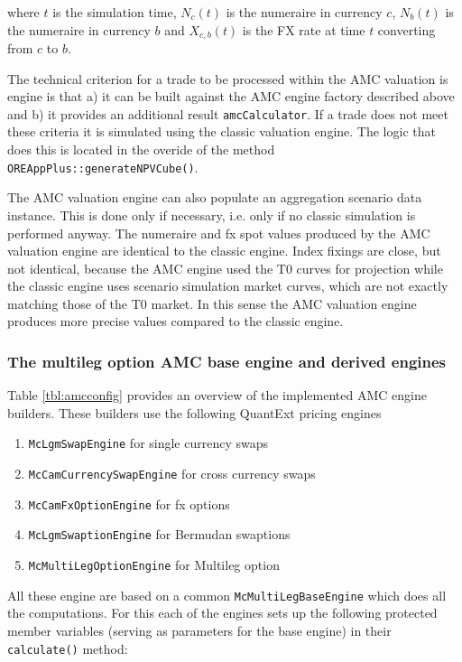 \documentclass[12pt, a4paper]{article}
\begin{document}
{\begin{appendix}
where $t$ is the simulation time, $N_c(t)$ is the numeraire in currency $c$, $N_b(t)$ is the numeraire in currency
$b$ and $X_{c,b}(t)$ is the FX rate at time $t$ converting from $c$ to $b$.

The technical criterion for a trade to be processed within the AMC valuation is engine is that a) it can be built
against the AMC engine factory described above and b) it provides an additional result \verb+amcCalculator+. If a trade
does not meet these criteria it is simulated using the classic valuation engine. The logic that does this is located in
the overide of the method \verb+OREAppPlus::generateNPVCube()+.

The AMC valuation engine can also populate an aggregation scenario data instance. This is done only if necessary,
i.e. only if no classic simulation is performed anyway. The numeraire and fx spot values produced by the AMC valuation
engine are identical to the classic engine. Index fixings are close, but not identical, because the AMC engine used the
T0 curves for projection while the classic engine uses scenario simulation market curves, which are not exactly matching
those of the T0 market. In this sense the AMC valuation engine produces more precise values compared to the classic
engine.

\subsubsection*{The multileg option AMC base engine and derived engines}\label{sec:amc_base_engine}

Table \ref{tbl:amcconfig} provides an overview of the implemented AMC engine builders. These builders use the following
QuantExt pricing engines

\begin{enumerate}
\item \verb+McLgmSwapEngine+ for single currency swaps
\item \verb+McCamCurrencySwapEngine+ for cross currency swaps
\item \verb+McCamFxOptionEngine+ for fx options
\item \verb+McLgmSwaptionEngine+ for Bermudan swaptions
\item \verb+McMultiLegOptionEngine+ for Multileg option
\end{enumerate}

All these engine are based on a common \verb+McMultiLegBaseEngine+ which does all the computations. For this each of the
engines sets up the following protected member variables (serving as parameters for the base engine) in their
\verb+calculate()+ method:


\end{appendix}}
\end{document}
